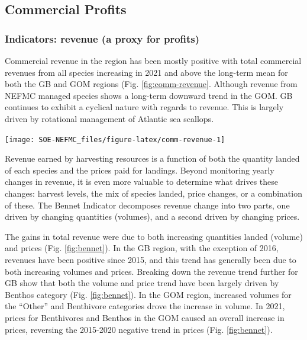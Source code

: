 \documentclass[
  10pt,
]{article}
\let\origfigure\figure
\let\endorigfigure\endfigure
\renewenvironment{figure}[1][2] {
    \expandafter\origfigure\expandafter[H]
} {
    \endorigfigure
}
\begin{document}
\hypertarget{commercial-profits}{%
\subsection{Commercial Profits}\label{commercial-profits}}

\hypertarget{indicators-revenue-a-proxy-for-profits}{%
\subsubsection{Indicators: revenue (a proxy for profits)}\label{indicators-revenue-a-proxy-for-profits}}

Commercial revenue in the region has been mostly positive with total commercial revenues from all species increasing in 2021 and above the long-term mean for both the GB and GOM regions (Fig. \ref{fig:comm-revenue}. Although revenue from NEFMC managed species shows a long-term downward trend in the GOM. GB continues to exhibit a cyclical nature with regards to revenue. This is largely driven by rotational management of Atlantic sea scallops.

\begin{figure}

{\centering \texttt{[image: SOE-NEFMC\_files/figure-latex/comm-revenue-1]} 

}

\caption{Revenue through 2021 for the New England region: total (black) and from NEFMC managed species (red).}\label{fig:comm-revenue}
\end{figure}

Revenue earned by harvesting resources is a function of both the quantity landed of each species and the prices paid for landings. Beyond monitoring yearly changes in revenue, it is even more valuable to determine what drives these changes: harvest levels, the mix of species landed, price changes, or a combination of these. The Bennet Indicator decomposes revenue change into two parts, one driven by changing quantities (volumes), and a second driven by changing prices.

The gains in total revenue were due to both increasing quantities landed (volume) and prices (Fig. \ref{fig:bennet}). In the GB region, with the exception of 2016, revenues have been positive since 2015, and this trend has generally been due to both increasing volumes and prices. Breaking down the revenue trend further for GB show that both the volume and price trend have been largely driven by Benthos category (Fig. \ref{fig:bennet}). In the GOM region, increased volumes for the ``Other'' and Benthivore categories drove the increase in volume. In 2021, prices for Benthivores and Benthos in the GOM caused an overall increase in prices, reversing the 2015-2020 negative trend in prices (Fig. \ref{fig:bennet}).
\end{document}
